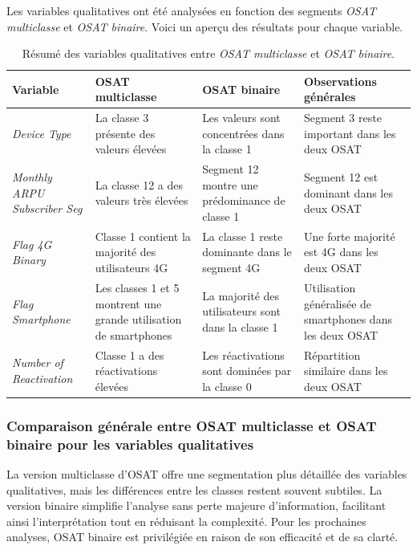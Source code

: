 Les variables qualitatives ont été analysées en fonction des segments \textit{OSAT multiclasse} et \textit{OSAT binaire}. Voici un aperçu des résultats pour chaque variable.

\begin{table}[H]
    \centering
    \begin{tabular}{|p{3.5cm}|p{3.5cm}|p{3.5cm}|p{3.5cm}|} 
    \hline
    \textbf{Variable} & \textbf{OSAT multiclasse} & \textbf{OSAT binaire} & \textbf{Observations générales} \\ 
    \hline
    \textit{Device Type} & 
    La classe 3 présente des valeurs élevées & 
    Les valeurs sont concentrées dans la classe 1 & 
    Segment 3 reste important dans les deux OSAT \\ 
    \hline
    \textit{Monthly ARPU Subscriber Seg} & 
    La classe 12 a des valeurs très élevées & 
    Segment 12 montre une prédominance de classe 1 & 
    Segment 12 est dominant dans les deux OSAT \\ 
    \hline
    \textit{Flag 4G Binary} & 
    Classe 1 contient la majorité des utilisateurs 4G & 
    La classe 1 reste dominante dans le segment 4G & 
    Une forte majorité est 4G dans les deux OSAT \\ 
    \hline
    \textit{Flag Smartphone} & 
    Les classes 1 et 5 montrent une grande utilisation de smartphones & 
    La majorité des utilisateurs sont dans la classe 1 & 
    Utilisation généralisée de smartphones dans les deux OSAT \\ 
    \hline
    \textit{Number of Reactivation} & 
    Classe 1 a des réactivations élevées & 
    Les réactivations sont dominées par la classe 0 & 
    Répartition similaire dans les deux OSAT \\ 
    \hline
    \end{tabular}
    \caption{Résumé des variables qualitatives entre \textit{OSAT multiclasse} et \textit{OSAT binaire}.}
\end{table}

\subsubsection*{Comparaison générale entre OSAT multiclasse et OSAT binaire pour les variables qualitatives}
La version multiclasse d'OSAT offre une segmentation plus détaillée des variables qualitatives, mais les différences entre les classes restent souvent subtiles. La version binaire simplifie l'analyse sans perte majeure d'information, facilitant ainsi l'interprétation tout en réduisant la complexité. Pour les prochaines analyses, OSAT binaire est privilégiée en raison de son efficacité et de sa clarté.

